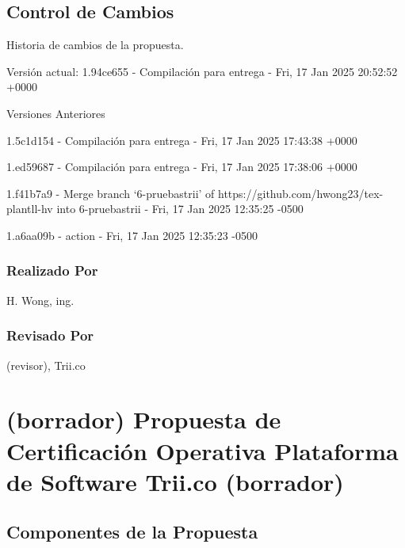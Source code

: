 \documentclass[
  paper=a4,
  ,captions=tableheading
]{scrartcl}
\renewenvironment{quote}{\begin{customblockquote}\list{}{\rightmargin=0em\leftmargin=0em}%
\item\relax\color{blockquote-text}\ignorespaces}{\unskip\unskip\endlist\end{customblockquote}}
\begin{document}
\begin{quote}
\end{quote}

\subsection{Control de Cambios}\label{sec:control-de-cambios}

Historia de cambios de la propuesta.

Versión actual: 1.94ce655 - Compilación para entrega - Fri, 17 Jan 2025
20:52:52 +0000

Versiones Anteriores

1.5c1d154 - Compilación para entrega - Fri, 17 Jan 2025 17:43:38 +0000

1.ed59687 - Compilación para entrega - Fri, 17 Jan 2025 17:38:06 +0000

1.f41b7a9 - Merge branch `6-pruebastrii' of
https://github.com/hwong23/tex-plantll-hv into 6-pruebastrii - Fri, 17
Jan 2025 12:35:25 -0500

1.a6aa09b - action - Fri, 17 Jan 2025 12:35:23 -0500

\subsubsection{Realizado Por}\label{sec:realizado-por}

H. Wong, ing.

\subsubsection{Revisado Por}\label{sec:revisado-por}

(revisor), Trii.co

\newpage

\section{(borrador) Propuesta de Certificación Operativa Plataforma de
Software Trii.co
(borrador)}\label{sec:borrador-propuesta-de-certificaciuxf3n-operativa-plataforma-de-software-trii.co-borrador}

\subsection{Componentes de la
Propuesta}\label{sec:componentes-de-la-propuesta}

\begin{quote}
\end{quote}
\end{document}
